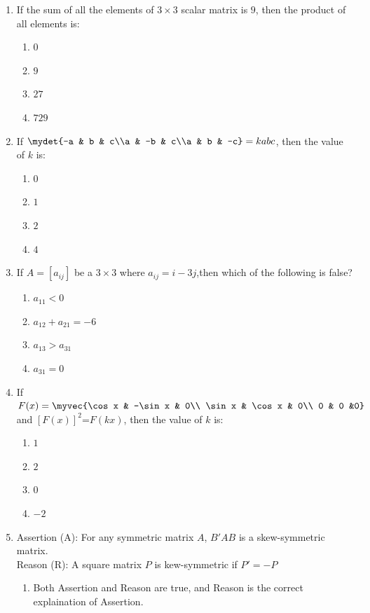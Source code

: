 \begin{enumerate}
    \item If the sum of all the elements of $3 \times 3$ scalar matrix is $9$, then the product of all elements is:
	    \begin{enumerate}
		    \item $0$
		    \item $9$
		    \item $27$
		    \item $729$
	    \end{enumerate}
    \item If $ \mydet{-a & b & c\\a & -b & c\\a & b & -c} = kabc$, then the value of $k$ is:
	    \begin{enumerate}
		    \item $0$
		    \item $1$
		    \item $2$
		    \item $4$
	    \end{enumerate}
    \item If $A=[a_{ij}]$ be a $3 \times 3$ where $a_{ij} = i - 3j$,then which of the following is false?
	    \begin{enumerate}
		    \item $a_{11}<0$
		    \item $a_{12} +a_{21} = -6$
		    \item $a_{13}>a_{31}$
		    \item $a_{31}=0$
	    \end{enumerate}
    \item If $F(x)= \myvec{\cos x & -\sin x & 0\\ \sin x & \cos x & 0\\ 0 & 0 &0}$ and $[F(x)]^2$=$F(kx)$, then the value of $k$ is:
	    \begin{enumerate}
		    \item $1$
		    \item $2$
		    \item $0$
		    \item $-2$
	    \end{enumerate}
    \item Assertion (A): For any symmetric matrix $A$, $B'AB$ is a skew-symmetric matrix.\\
	  Reason (R): A square matrix $P$ is kew-symmetric if $P'=-P$
		\begin{enumerate}
			\item Both Assertion and Reason are true, and Reason is the correct explaination of Assertion.

\end{enumerate}
\end{enumerate}
